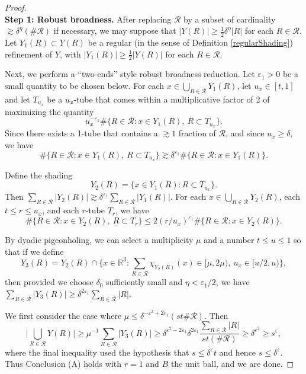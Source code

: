 \documentclass[letterpaper, reqno,11pt]{article}
\numberwithin{equation}{section}
\newcommand{\RR}{\mathbb{R}}
\newcommand{\eps}{\varepsilon}
\numberwithin{thm}{section}
\theoremstyle{remark}
\begin{document}
\begin{proof}$\phantom{1}$\\
{\bf Step 1: Robust broadness.} 
After replacing $\mathcal{R}$ by a subset of cardinality $\gtrsim\delta^{\eta}(\#\mathcal{R})$ if necessary, we may suppose that $|Y(R)|\geq \frac{1}{2}\delta^{\eta}|R|$ for each $R\in\mathcal{R}$. Let $Y_1(R)\subset Y(R)$ be a regular (in the sense of Definition \ref{regularShading}) refinement of $Y$, with $|Y_1(R)|\geq\frac{1}{2}|Y(R)|$ for each $R\in\mathcal{R}$. 


Next, we perform a ``two-ends'' style robust broadness reduction. Let $\eps_1>0$ be a small quantity to be chosen below. For each $x\in\bigcup_{R\in\mathcal{R}}Y_1(R)$, let $u_x\in [t, 1]$ and let $T_{u_x}$ be a $u_x$-tube that comes within a multiplicative factor of 2 of maximizing the quantity
\[
u_x^{-\eps_1}\#\{R\in\mathcal{R}\colon x\in Y_1(R),\ R\subset T_{u_x}\}.
\]
Since there exists a 1-tube that contains a $\gtrsim 1$ fraction of $\mathcal{R}$, and since $u_x\geq\delta$, we have
\[
\#\{R\in\mathcal{R}\colon x\in Y_1(R),\ R\subset T_{u_x}\}\gtrsim \delta^{\eps_1}\#\{R\in\mathcal{R}\colon x\in Y_1(R)\}.
\]

Define the shading
\[
Y_2(R)=\{x\in Y_1(R)\colon R\subset T_{u_x}\}.
\]
Then $\sum_{R\in\mathcal{R}}|Y_2(R)|\gtrsim \delta^{\eps_1}\sum_{R\in\mathcal{R}}|Y_1(R)|$. For each $x\in\bigcup_{R\in\mathcal{R}}Y_2(R)$, each $t\leq r\leq u_x$, and each $r$-tube $T_r$, we have
\begin{equation}\label{notTooMuchConcentrationInAnRTube}
\#\{R\in\mathcal{R}\colon x\in Y_2(R),\ R\subset T_r\}\leq 2(r/u_x)^{\eps_1}\#\{R\in\mathcal{R}\colon x\in Y_2(R)\}.
\end{equation}
%

By dyadic pigeonholing, we can select a multiplicity $\mu$ and a number $t\leq u\leq 1$ so that if we define
\[
Y_3(R) = Y_2(R) \cap \Big\{x \in\RR^3\colon \sum_{R\in\mathcal{R}}\chi_{Y_2(R)}(x)\in[\mu,2\mu),\ u_x \in [u/2, u)\Big\},
\]
then provided we choose $\delta_0$ sufficiently small and $\eta<\eps_1/2$, we have $\sum_{R\in\mathcal{R}}|Y_3(R)|\geq \delta^{2\eps_1}\sum_{R\in\mathcal{R}}|R|$.


We first consider the case where $\mu\leq\delta^{-\eps^2+2\eps_1}(st\#\mathcal{R})$. Then 
\[
\Big|\bigcup_{R\in\mathcal{R}}Y(R)\Big|\geq \mu^{-1}\sum_{R\in\mathcal{R}}|Y_3(R)|\geq \delta^{\eps^2-2\eps_1}\delta^{2\eps_1} \frac{\sum_{R\in\mathcal{R}}|R|}{st(\#\mathcal{R})}\geq\delta^{\eps^2}\geq s^{\eps},
\]
where the final inequality used the hypothesis that $s\leq\delta^{\eps}t$ and hence $s\leq\delta^\eps$. Thus Conclusion (A) holds with $r=1$ and $B$ the unit ball, and we are done. 



\end{proof}
\end{document}
